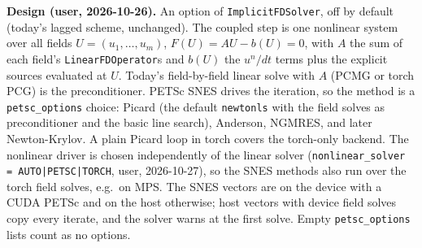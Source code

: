 \documentclass[11pt]{article}
\begin{document}
\textbf{Design (user, 2026-10-26).} An option of \texttt{ImplicitFDSolver}, off by
default (today's lagged scheme, unchanged). The coupled step is one nonlinear
system over all fields $U = (u_1, \dots, u_m)$,
$F(U) = A U - b(U) = 0$, with $A$ the sum of each field's
\texttt{LinearFDOperator}s and $b(U)$ the $u^n/dt$ terms plus the explicit
sources evaluated at $U$. Today's field-by-field linear solve with $A$ (PCMG or
torch PCG) is the preconditioner. PETSc SNES drives the iteration, so the method
is a \texttt{petsc\_options} choice: Picard (the default \texttt{newtonls} with the
field solves as preconditioner and the basic line search), Anderson,
NGMRES, and later Newton-Krylov. A plain Picard loop in torch covers the torch-only
backend. The nonlinear driver is chosen independently of the linear solver
(\texttt{nonlinear\_solver = AUTO|PETSC|TORCH}, user, 2026-10-27), so the SNES
methods also run over the torch field solves, e.g.\ on MPS. The SNES vectors are
on the device with a CUDA PETSc and on the host otherwise; host vectors with
device field solves copy every iterate, and the solver warns at the first solve.
Empty \texttt{petsc\_options} lists count as no options.
\end{document}
